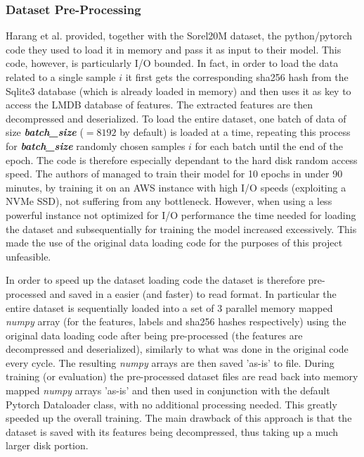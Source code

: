\documentclass[pdfa%
,cucitura%
]{toptesi}
\begin{document}
\subsubsection{Dataset Pre-Processing}
Harang et al. \cite{HarangSOREL20M} provided, together with the Sorel20M dataset, the python/pytorch code they used to load it in memory and pass it as input to their model. This code, however, is particularly I/O bounded. In fact, in order to load the data related to a single sample $i$ it first gets the corresponding sha256 hash from the Sqlite3 database (which is already loaded in memory) and then uses it as key to access the LMDB database of features. The extracted features are then decompressed and deserialized. To load the entire dataset, one batch of data of size \textit{\textbf{batch\_size}} ($=8192$ by default) is loaded at a time, repeating this process for \textit{\textbf{batch\_size}} randomly chosen samples $i$ for each batch until the end of the epoch. The code is therefore especially dependant to the hard disk random access speed. The authors of \cite{HarangSOREL20M} managed to train their model for 10 epochs in under 90 minutes, by training it on an AWS instance with high I/O speeds (exploiting a NVMe SSD), not suffering from any bottleneck. However, when using a less powerful instance not optimized for I/O performance the time needed for loading the dataset and subsequentially for training the model increased excessively. This made the use of the original data loading code for the purposes of this project unfeasible.

In order to speed up the dataset loading code the dataset is therefore pre-processed and saved in a easier (and faster) to read format. In particular the entire dataset is sequentially loaded into a set of 3 parallel memory mapped \textit{numpy} array (for the features, labels and sha256 hashes respectively) using the original data loading code after being pre-processed (the features are decompressed and deserialized), similarly to what was done in the original code every cycle. The resulting \textit{numpy} arrays are then saved 'as-is' to file. During training (or evaluation) the pre-processed dataset files are read back into memory mapped \textit{numpy} arrays 'as-is' and then used in conjunction with the default Pytorch Dataloader class, with no additional processing needed. This greatly speeded up the overall training. The main drawback of this approach is that the dataset is saved with its features being decompressed, thus taking up a much larger disk portion.
\end{document}
